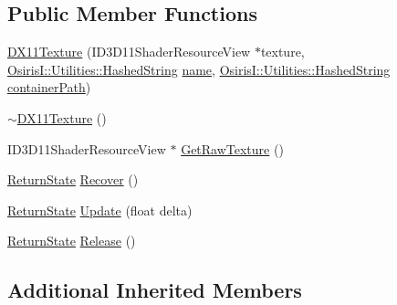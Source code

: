 \subsection*{Public Member Functions}
\begin{DoxyCompactItemize}
\item 
\hyperlink{class_osiris_i_1_1_graphics_1_1_actors_1_1_d_x11_texture_ac3fddfedb2ac80088c2c96cc09852a8b}{D\-X11\-Texture} (I\-D3\-D11\-Shader\-Resource\-View $\ast$texture, \hyperlink{class_osiris_i_1_1_utilities_1_1_hashed_string}{Osiris\-I\-::\-Utilities\-::\-Hashed\-String} \hyperlink{class_osiris_i_1_1_i_osiris_object_a6a3324b9c5ea3afabc9f3ffd9b666db9}{name}, \hyperlink{class_osiris_i_1_1_utilities_1_1_hashed_string}{Osiris\-I\-::\-Utilities\-::\-Hashed\-String} \hyperlink{class_osiris_i_1_1_graphics_1_1_actors_1_1_i_texture_a477657c9ca16ece4465a2833ae14ce14}{container\-Path})
\item 
\hyperlink{class_osiris_i_1_1_graphics_1_1_actors_1_1_d_x11_texture_a4fab9aa096f9163a229fd220303d0fc5}{$\sim$\-D\-X11\-Texture} ()
\item 
I\-D3\-D11\-Shader\-Resource\-View $\ast$ \hyperlink{class_osiris_i_1_1_graphics_1_1_actors_1_1_d_x11_texture_a42765b6615a30a4a5fbb528d82a380c3}{Get\-Raw\-Texture} ()
\item 
\hyperlink{namespace_osiris_i_a8f53bf938dc75c65c6a529694514013e}{Return\-State} \hyperlink{class_osiris_i_1_1_graphics_1_1_actors_1_1_d_x11_texture_adb53725c1f77e38bc9d8c303a29b11f0}{Recover} ()
\item 
\hyperlink{namespace_osiris_i_a8f53bf938dc75c65c6a529694514013e}{Return\-State} \hyperlink{class_osiris_i_1_1_graphics_1_1_actors_1_1_d_x11_texture_a4c7bb942c4c93190febf992a87c480f8}{Update} (float delta)
\item 
\hyperlink{namespace_osiris_i_a8f53bf938dc75c65c6a529694514013e}{Return\-State} \hyperlink{class_osiris_i_1_1_graphics_1_1_actors_1_1_d_x11_texture_a144e0353cc499ff4a0ab73e64de4c729}{Release} ()
\end{DoxyCompactItemize}
\subsection*{Additional Inherited Members}


